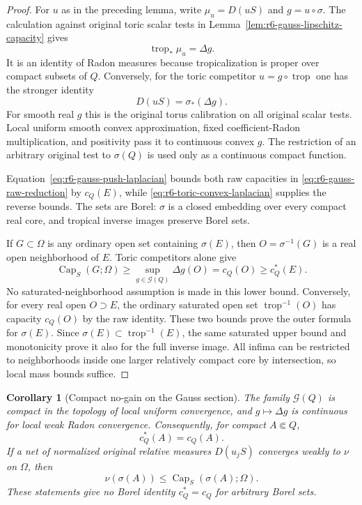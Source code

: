 \documentclass[11pt,a4paper]{article}
\numberwithin{equation}{section}
\newtheorem{corollary}[theorem]{Corollary}
\theoremstyle{definition}
\theoremstyle{remark}
\begin{document}
\begin{proof}
For $u$ as in the preceding lemma, write $\mu_u=D(uS)$ and
$g=u\circ\sigma$. The calculation against original toric scalar
tests in Lemma~\ref{lem:r6-gauss-lipschitz-capacity} gives
\begin{equation}
                  \operatorname{trop}_*\mu_u=\Delta g.
 \label{eq:r6-gauss-push-laplacian}
\end{equation}
It is an identity of Radon measures because tropicalization is proper
over compact subsets of $Q$. Conversely, for the toric competitor
$u=g\circ\operatorname{trop}$ one has the stronger identity
\begin{equation}
                         D(uS)=\sigma_*(\Delta g).
 \label{eq:r6-toric-convex-laplacian}
\end{equation}
For smooth real $g$ this is the original torus calibration on all
original scalar tests. Local uniform smooth convex approximation,
fixed coefficient-Radon multiplication, and positivity pass it to
continuous convex $g$. The restriction of an arbitrary original test
to $\sigma(Q)$ is used only as a continuous compact function.

Equation~\eqref{eq:r6-gauss-push-laplacian} bounds both raw capacities
in \eqref{eq:r6-gauss-raw-reduction} by $c_Q(E)$, while
\eqref{eq:r6-toric-convex-laplacian} supplies the reverse bounds.
The sets are Borel: $\sigma$ is a closed embedding over every compact
real core, and tropical inverse images preserve Borel sets.

If $G\subset\Omega$ is any ordinary open set containing $\sigma(E)$,
then $O=\sigma^{-1}(G)$ is a real open neighborhood of $E$. Toric
competitors alone give
\[
       \operatorname{Cap}_S(G;\Omega)
           \ge\sup_{g\in\mathcal G(Q)}\Delta g(O)=c_Q(O)
           \ge c_Q^*(E).
\]
No saturated-neighborhood assumption is made in this lower bound.
Conversely, for every real open $O\supset E$, the ordinary saturated
open set $\operatorname{trop}^{-1}(O)$ has capacity $c_Q(O)$ by the
raw identity. These two bounds prove the outer formula for
$\sigma(E)$. Since
$\sigma(E)\subset\operatorname{trop}^{-1}(E)$, the same saturated
upper bound and monotonicity prove it also for the full inverse image.
All infima can be restricted to neighborhoods inside one larger
relatively compact core by intersection, so local mass bounds suffice.
\end{proof}

\begin{corollary}[Compact no-gain on the Gauss section]
\label{cor:r6-gauss-compact-no-gain}
The family $\mathcal G(Q)$ is compact in the topology of local uniform
convergence, and $g\mapsto\Delta g$ is continuous for local weak
Radon convergence. Consequently, for compact $A\Subset Q$,
\[
                         c_Q^*(A)=c_Q(A).
\]
If a net of normalized original relative measures $D(u_jS)$ converges
weakly to $\nu$ on $\Omega$, then
\[
            \nu(\sigma(A))\le\operatorname{Cap}_S(\sigma(A);\Omega).
\]
These statements give no Borel identity $c_Q^*=c_Q$ for arbitrary
Borel sets.
\end{corollary}
\end{document}
